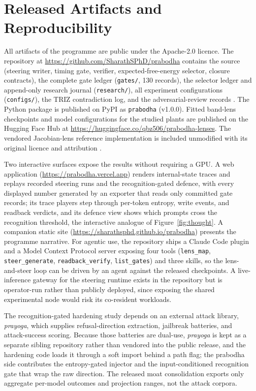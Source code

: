 \section{Released Artifacts and Reproducibility}
\label{sec:artifacts}

All artifacts of the programme are public under the Apache-2.0 licence. The repository at \url{https://github.com/SharathSPhD/prabodha} contains the source (steering writer, timing gate, verifier, expected-free-energy selector, closure contracts), the complete gate ledger (\texttt{gates/}, 130 records), the selector ledger and append-only research journal (\texttt{research/}), all experiment configurations (\texttt{configs/}), the TRIZ contradiction log, and the adversarial-review records \cite{Prabodha2026}. The Python package is published on PyPI as \texttt{prabodha} (v1.0.0). Fitted band-lens checkpoints and model configurations for the studied plants are published on the Hugging Face Hub at \url{https://huggingface.co/qbz506/prabodha-lenses}. The vendored Jacobian-lens reference implementation is included unmodified with its original licence and attribution \cite{JacobianLens2026}.

Two interactive surfaces expose the results without requiring a GPU. A web application (\url{https://prabodha.vercel.app}) renders internal-state traces and replays recorded steering runs and the recognition-gated defence, with every displayed number generated by an exporter that reads only committed gate records; its trace players step through per-token entropy, write events, and readback verdicts, and its defence view shows which prompts cross the recognition threshold, the interactive analogue of Figure~\ref{fig:thought}. A companion static site (\url{https://sharathsphd.github.io/prabodha}) presents the programme narrative. For agentic use, the repository ships a Claude Code plugin and a Model Context Protocol server exposing four tools (\texttt{lens\_map}, \texttt{steer\_generate}, \texttt{readback\_verify}, \texttt{list\_gates}) and three skills, so the lens-and-steer loop can be driven by an agent against the released checkpoints. A live-inference gateway for the steering runtime exists in the repository but is operator-run rather than publicly deployed, since exposing the shared experimental node would risk its co-resident workloads.

The recognition-gated hardening study depends on an external attack library, \emph{prayoga}, which supplies refusal-direction extraction, jailbreak batteries, and attack-success scoring. Because those batteries are dual-use, \emph{prayoga} is kept as a separate sibling repository rather than vendored into the public release, and the hardening code loads it through a soft import behind a path flag; the prabodha side contributes the entropy-gated injector and the input-conditioned recognition gate that wrap the raw direction. The released moat consolidation exports only aggregate per-model outcomes and projection ranges, not the attack corpora.

